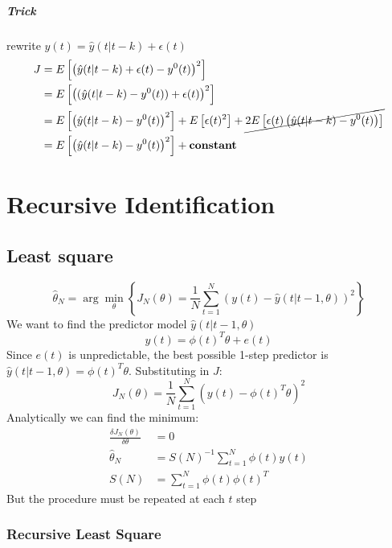 \documentclass{report}
\begin{document}
\paragraph{Trick} rewrite $y(t)=\hat{y}(t|t-k)+\epsilon(t)$
\begin{align*}
J&=E\left[\left(\hat{y}(t|t-k)+\epsilon(t)-y^0(t)\right)^2\right]\\
&=E\left[\left((\hat{y}(t|t-k)-y^0(t))+\epsilon(t)\right)^2\right]\\
&=E\left[\left(
\hat{y}(t|t-k)-y^0(t)\right)^2\right]
+E\left[\epsilon(t)^2\right]
+\cancel{2E\left[\epsilon(t)\left(\hat{y}(t|t-k)-y^0(t)\right)\right]}\\
&=E\left[\left(
\hat{y}(t|t-k)-y^0(t)\right)^2\right]+\textbf{constant}
\end{align*}

\chapter{Recursive Identification}
\section{Least square}
\[
\hat{\theta}_N=\arg\min_\theta
\left\lbrace
J_N(\theta)=
\frac{1}{N}\sum_{t=1}^{N}
\left(
y(t)-\hat{y}(t|t-1,\theta)
\right)^2
\right\rbrace
\]
We want to find the predictor model $\hat{y}(t|t-1,\theta)$
\[
y(t)=\phi(t)^T\theta+e(t)
\]
Since $e(t)$ is unpredictable, the best possible 1-step predictor is $\hat{y}(t|t-1,\theta)=\phi(t)^T\theta$. Substituting in $J$:
\[
J_N(\theta)=\frac{1}{N}
\sum_{t=1}^N
\left(y(t)-\phi(t)^T\theta\right)^2
\]
Analytically we can find the minimum:
\begin{align*}
\frac{\delta J_N(\theta)}{\delta \theta}&=0\\
\hat{\theta}_N&=S(N)^{-1}\sum_{t=1}^N \phi(t)y(t)\\
S(N)&=\sum_{t=1}^N \phi(t)\phi(t)^T
\end{align*}
But the procedure must be repeated at each $t$ step
\subsection{Recursive Least Square}
\begin{center}
\end{center}
\end{document}
